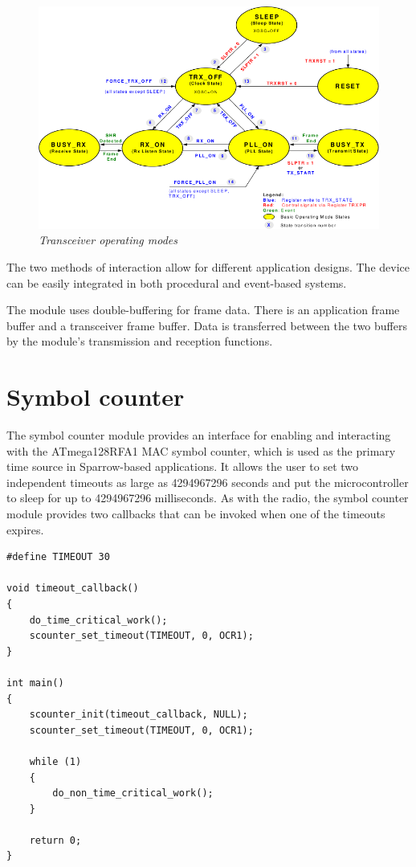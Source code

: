 \begin{figure}[ht]
	\begin{center}
		\includegraphics[width=\textwidth]
		{img/transceiver_operating_modes.png}
	\end{center}
	\caption{\small \itshape{Transceiver operating
	modes\protect\footnotemark}}
\end{figure}

The two methods of interaction allow for different application designs.
The device can be easily integrated in both procedural and event-based systems.

The module uses double-buffering for frame data. There is an application frame
buffer and a transceiver frame buffer. Data is transferred between the two
buffers by the module's transmission and reception functions.

\section{Symbol counter}

The symbol counter module provides an interface for enabling and interacting
with the ATmega128RFA1 MAC symbol counter, which is used as the primary time
source in Sparrow-based applications. It allows the user to set two independent
timeouts as large as 4294967296 seconds and put the microcontroller to sleep
for up to 4294967296 milliseconds. As with the radio, the symbol counter module
provides two callbacks that can be invoked when one of the timeouts expires.

\lstset{
	language=C, numbers=none, caption=Time critical action snippet,
	label=lst:scounter_snippet
}
\begin{lstlisting}
#define TIMEOUT	30

void timeout_callback()
{
	do_time_critical_work();
	scounter_set_timeout(TIMEOUT, 0, OCR1);
}

int main()
{
	scounter_init(timeout_callback, NULL);
	scounter_set_timeout(TIMEOUT, 0, OCR1);

	while (1)
	{
		do_non_time_critical_work();
	}

	return 0;
}
\end{lstlisting}

